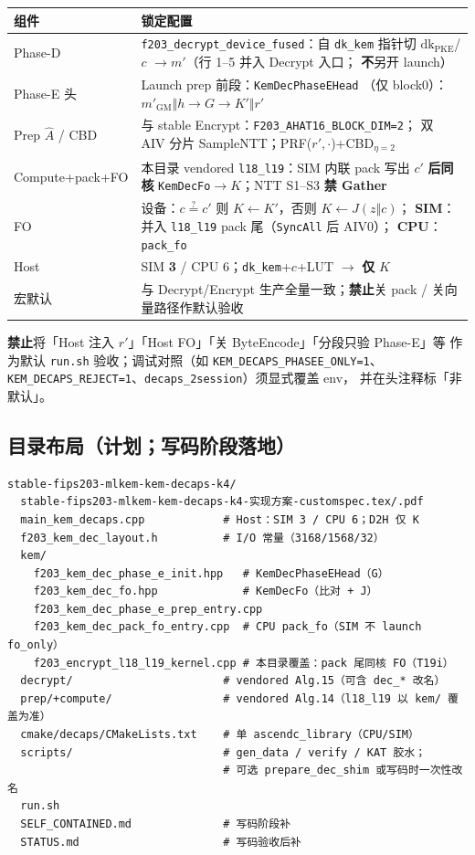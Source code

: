 \documentclass[UTF8,a4paper,11pt]{ctexart}
\begin{document}
\begin{longtable}{@{}L{4.2cm}L{8.8cm}@{}}
\toprule
组件 & 锁定配置 \\
\midrule
Phase-D &
  \texttt{f203\_decrypt\_device\_fused}：自 \texttt{dk\_kem} 指针切
  $\mathrm{dk}_{\mathrm{PKE}}$/$c$ $\to m'$（行 1--5 并入 Decrypt 入口；
  \textbf{不}另开 launch） \\
Phase-E 头 & Launch prep 前段：\texttt{KemDecPhaseEHead}
         （仅 block0）：$m'_{\mathrm{GM}}\Vert h\to G\to K'\Vert r'$ \\
Prep $\hat{A}$ / CBD & 与 stable Encrypt：\texttt{F203\_AHAT16\_BLOCK\_DIM=2}；
               双 AIV 分片 SampleNTT；PRF($r',\cdot$)+CBD$_{\eta=2}$ \\
Compute+pack+FO & 本目录 vendored \texttt{l18\_l19}：SIM 内联 pack 写出 $c'$
               \textbf{后同核} \texttt{KemDecFo}$\to K$；NTT S1--S3 \textbf{禁 Gather} \\
FO & 设备：$c\stackrel{?}{=}c'$ 则 $K\leftarrow K'$，否则 $K\leftarrow J(z\Vert c)$；
     \textbf{SIM}：并入 \texttt{l18\_l19} pack 尾（\texttt{SyncAll} 后 AIV0）；
     \textbf{CPU}：\texttt{pack\_fo} \\
Host & SIM \textbf{3} / CPU 6；\texttt{dk\_kem}+$c$+LUT $\to$ \textbf{仅} $K$ \\
宏默认 & 与 Decrypt/Encrypt 生产全量一致；\textbf{禁止}关 pack / 关向量路径作默认验收 \\
\bottomrule
\end{longtable}

\textbf{禁止}将「Host 注入 $r'$」「Host FO」「关 ByteEncode」「分段只验 Phase-E」等
作为默认 \texttt{run.sh} 验收；调试对照（如 \texttt{KEM\_DECAPS\_PHASEE\_ONLY=1}、
\texttt{KEM\_DECAPS\_REJECT=1}、\texttt{decaps\_2session}）须显式覆盖 env，
并在头注释标「非默认」。

\subsection{目录布局（计划；写码阶段落地）}

\begin{verbatim}
stable-fips203-mlkem-kem-decaps-k4/
  stable-fips203-mlkem-kem-decaps-k4-实现方案-customspec.tex/.pdf
  main_kem_decaps.cpp            # Host：SIM 3 / CPU 6；D2H 仅 K
  f203_kem_dec_layout.h          # I/O 常量（3168/1568/32）
  kem/
    f203_kem_dec_phase_e_init.hpp   # KemDecPhaseEHead（G）
    f203_kem_dec_fo.hpp             # KemDecFo（比对 + J）
    f203_kem_dec_phase_e_prep_entry.cpp
    f203_kem_dec_pack_fo_entry.cpp  # CPU pack_fo（SIM 不 launch fo_only）
    f203_encrypt_l18_l19_kernel.cpp # 本目录覆盖：pack 尾同核 FO（T19i）
  decrypt/                       # vendored Alg.15（可含 dec_* 改名）
  prep/+compute/                 # vendored Alg.14（l18_l19 以 kem/ 覆盖为准）
  cmake/decaps/CMakeLists.txt    # 单 ascendc_library（CPU/SIM）
  scripts/                       # gen_data / verify / KAT 胶水；
                                 # 可选 prepare_dec_shim 或写码时一次性改名
  run.sh
  SELF_CONTAINED.md              # 写码阶段补
  STATUS.md                      # 写码验收后补
\end{verbatim}
\end{document}
